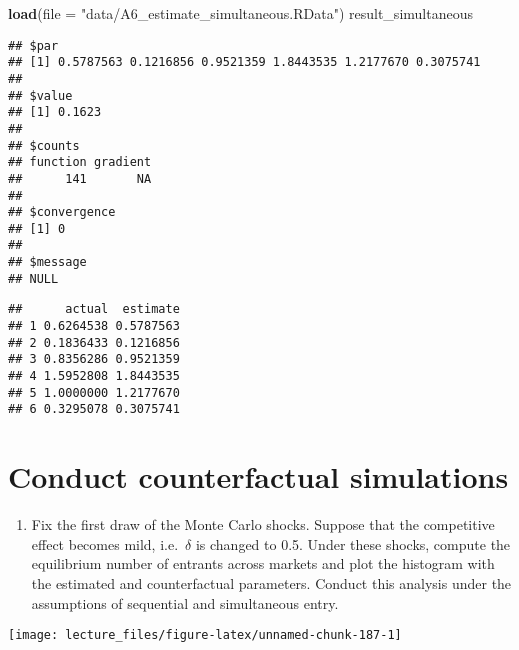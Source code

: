 \documentclass[
]{book}
\newenvironment{Shaded}{\begin{snugshade}}{\end{snugshade}}
\newcommand{\DataTypeTok}[1]{\textcolor[rgb]{0.13,0.29,0.53}{#1}}
\newcommand{\KeywordTok}[1]{\textcolor[rgb]{0.13,0.29,0.53}{\textbf{#1}}}
\newcommand{\NormalTok}[1]{#1}
\newcommand{\OperatorTok}[1]{\textcolor[rgb]{0.81,0.36,0.00}{\textbf{#1}}}
\newcommand{\StringTok}[1]{\textcolor[rgb]{0.31,0.60,0.02}{#1}}
\providecommand{\tightlist}{%
  \setlength{\itemsep}{0pt}\setlength{\parskip}{0pt}}
\begin{document}
\begin{Shaded}
\begin{Highlighting}[]
\KeywordTok{load}\NormalTok{(}\DataTypeTok{file =} \StringTok{"data/A6_estimate_simultaneous.RData"}\NormalTok{)}
\NormalTok{result_simultaneous}
\end{Highlighting}
\end{Shaded}

\begin{verbatim}
## $par
## [1] 0.5787563 0.1216856 0.9521359 1.8443535 1.2177670 0.3075741
## 
## $value
## [1] 0.1623
## 
## $counts
## function gradient 
##      141       NA 
## 
## $convergence
## [1] 0
## 
## $message
## NULL
\end{verbatim}

\begin{Shaded}
\end{Shaded}

\begin{verbatim}
##      actual  estimate
## 1 0.6264538 0.5787563
## 2 0.1836433 0.1216856
## 3 0.8356286 0.9521359
## 4 1.5952808 1.8443535
## 5 1.0000000 1.2177670
## 6 0.3295078 0.3075741
\end{verbatim}

\hypertarget{conduct-counterfactual-simulations}{%
\section{Conduct counterfactual simulations}\label{conduct-counterfactual-simulations}}

\begin{enumerate}
\def\labelenumi{\arabic{enumi}.}
\tightlist
\item
  Fix the first draw of the Monte Carlo shocks. Suppose that the competitive effect becomes mild, i.e.~\(\delta\) is changed to 0.5. Under these shocks, compute the equilibrium number of entrants across markets and plot the histogram with the estimated and counterfactual parameters. Conduct this analysis under the assumptions of sequential and simultaneous entry.
\end{enumerate}

\begin{center}\texttt{[image: lecture\_files/figure-latex/unnamed-chunk-187-1]} \end{center}
\end{document}
